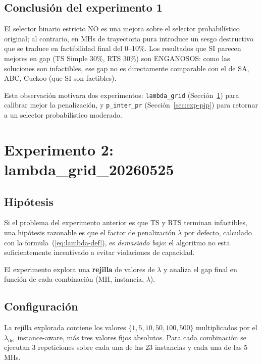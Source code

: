 \subsection{Conclusión del experimento 1}

El selector binario estricto NO es una mejora sobre el selector
probabilístico original; al contrario, en MHs de trayectoria pura
introduce un sesgo destructivo que se traduce en factibilidad final
del 0--10\%. Los resultados que SI parecen mejores en gap (TS Simple
30\%, RTS 30\%) son ENGANOSOS: como las soluciones son infactibles,
ese gap no es directamente comparable con el de SA, ABC, Cuckoo (que
SI son factibles).

Esta observación motivara dos experimentos: \texttt{lambda\_grid}
(Sección~\ref{sec:exp-lambda}) para calibrar mejor la penalización, y
\texttt{p\_inter\_pr} (Sección~\ref{sec:exp-pip}) para retornar a un
selector probabilístico moderado.

\section{Experimento 2: lambda\_grid\_20260525}
\label{sec:exp-lambda}

\subsection{Hipótesis}

Si el problema del experimento anterior es que TS y RTS terminan
infactibles, una hipótesis razonable es que el factor de penalización
$\lambda$ por defecto, calculado con la formula~(\ref{eq:lambda-def}),
es \emph{demasiado bajo}: el algoritmo no esta suficientemente
incentivado a evitar violaciones de capacidad.

El experimento explora una \textbf{rejilla} de valores de $\lambda$ y
analiza el gap final en función de cada combinación (MH, instancia,
$\lambda$).

\subsection{Configuración}

La rejilla explorada contiene los valores
$\{1, 5, 10, 50, 100, 500\}$ multiplicados por el $\lambda_{\text{def}}$
instance-aware, más tres valores fijos absolutos. Para cada
combinación se ejecutan 3 repeticiones sobre cada una de las 23
instancias y cada una de las 5 MHs.

